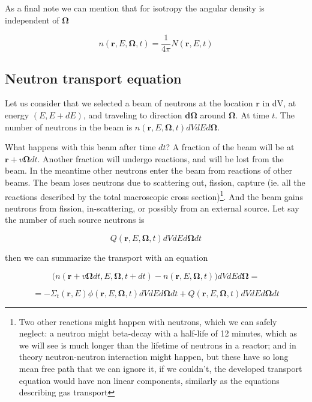 As a final note we can mention that for isotropy the angular density is independent of $\mathbf{\Omega}$

$$n(\mathbf{r},E,\mathbf{\Omega},t)=\frac{1}{4\pi}N(\mathbf{r},E,t)$$


\subsection{Neutron transport equation}

Let us consider that we selected a beam of neutrons at the location $\mathbf{r}$ in dV, at energy $(E,E+dE)$, and traveling to direction  $\mathbf{d\Omega}$ around $\mathbf{\Omega}$. At time $t$. The number of neutrons in the beam is $n(\mathbf{r},E,\mathbf{\Omega},t)dVdEd\mathbf{\Omega}$.

What happens with this beam after time $dt$? A fraction of the beam will be at $\mathbf{r}+v\mathbf{\Omega}dt$. Another fraction will undergo reactions, and will be lost from the beam. In the meantime other neutrons enter the beam from reactions of other beams. The beam loses neutrons due to scattering out, fission, capture (ie. all the reactions described by the total macroscopic cross section)\footnote{Two other reactions might happen with neutrons, which we can safely neglect: a neutron might beta-decay with a half-life of 12 minutes, which as we will see is much longer than the lifetime of neutrons in a reactor; and in theory neutron-neutron interaction might happen, but these have so long mean free path that we can ignore it, if we couldn't, the developed transport equation would have non linear components, similarly as the equations describing gas transport}. And the beam gains neutrons from fission, in-scattering, or possibly from an external source. Let say the number of such source neutrons is

$$Q(\mathbf{r},E,\mathbf{\Omega},t)dVdEd\mathbf{\Omega}dt$$

\noindent then we can summarize the transport with an equation

\begin{equation}
\Big(n(\mathbf{r}+v\mathbf{\Omega}dt,E,\mathbf{\Omega},t+dt)-n(\mathbf{r},E,\mathbf{\Omega},t)\Big)dVdEd\mathbf{\Omega}=
\end{equation}

\begin{equation*}
=-\Sigma_t(\mathbf{r},E)\phi(\mathbf{r},E,\mathbf{\Omega},t)dVdEd\mathbf{\Omega}dt+Q(\mathbf{r},E,\mathbf{\Omega},t)dVdEd\mathbf{\Omega}dt
\end{equation*}

